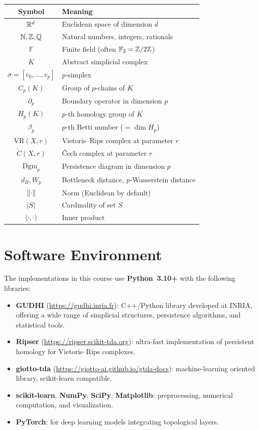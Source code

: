 \begin{center}
\renewcommand{\arraystretch}{1.3}
\begin{tabular}{cl}
\toprule
\textbf{Symbol} & \textbf{Meaning} \\
\midrule
$\mathbb{R}^d$ & Euclidean space of dimension $d$ \\
$\mathbb{N}, \mathbb{Z}, \mathbb{Q}$ & Natural numbers, integers, rationals \\
$\mathbb{F}$ & Finite field (often $\mathbb{F}_2 = \mathbb{Z}/2\mathbb{Z}$) \\
$K$ & Abstract simplicial complex \\
$\sigma = [v_0, \ldots, v_p]$ & $p$-simplex \\
$C_p(K)$ & Group of $p$-chains of $K$ \\
$\partial_p$ & Boundary operator in dimension $p$ \\
$H_p(K)$ & $p$-th homology group of $K$ \\
$\beta_p$ & $p$-th Betti number ($= \dim H_p$) \\
$\mathrm{VR}(X, r)$ & Vietoris--Rips complex at parameter $r$ \\
$\check{C}(X, r)$ & \v{C}ech complex at parameter $r$ \\
$\mathrm{Dgm}_p$ & Persistence diagram in dimension $p$ \\
$d_B, W_p$ & Bottleneck distance, $p$-Wasserstein distance \\
$\left\| \cdot \right\|$ & Norm (Euclidean by default) \\
$\left| S \right|$ & Cardinality of set $S$ \\
$\langle \cdot, \cdot \rangle$ & Inner product \\
\bottomrule
\end{tabular}
\end{center}

\section*{Software Environment}

The implementations in this course use \textbf{Python~3.10+} with the
following libraries:

\begin{itemize}
  \item \textbf{GUDHI} (\url{https://gudhi.inria.fr}): C++/Python library
        developed at INRIA, offering a wide range of simplicial structures,
        persistence algorithms, and statistical tools.
  \item \textbf{Ripser} (\url{https://ripser.scikit-tda.org}): ultra-fast
        implementation of persistent homology for Vietoris--Rips complexes.
  \item \textbf{giotto-tda} (\url{https://giotto-ai.github.io/gtda-docs}):
        machine-learning oriented library, scikit-learn compatible.
  \item \textbf{scikit-learn}, \textbf{NumPy}, \textbf{SciPy},
        \textbf{Matplotlib}: preprocessing, numerical computation, and
        visualization.
  \item \textbf{PyTorch}: for deep learning models integrating topological
        layers.
\end{itemize}

